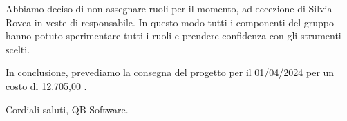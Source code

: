 \documentclass[12pt]{article}
\begin{document}
	\noindent
	
	\clearpage
	\noindent
	Abbiamo deciso di non assegnare ruoli per il momento, ad eccezione di Silvia Rovea in veste di responsabile. In questo modo tutti i componenti del gruppo hanno potuto sperimentare tutti i ruoli e prendere confidenza con gli strumenti scelti.
	
	\noindent
	In conclusione, prevediamo la consegna del progetto per il 01/04/2024 per un costo di 12.705,00 \texteuro.        
	\newline
	
	
	
	\noindent
	Cordiali saluti,
	\newline
	QB Software.
\end{document}
